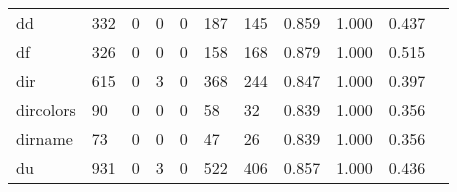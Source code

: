 \begin{longtable}{lp{1.2cm}p{1.2cm}p{1.2cm}p{1.2cm}p{1.2cm}p{1.2cm}p{1.2cm}p{1.2cm}p{1.2cm}p{1.2cm}}
dd        &                                   332 &                                                  0 &                                                  0 &                                                  0 &                                                187 &                                                145 &                                         0.859 &                                              1.000 &                                              0.437 \\
df        &                                   326 &                                                  0 &                                                  0 &                                                  0 &                                                158 &                                                168 &                                         0.879 &                                              1.000 &                                              0.515 \\
dir       &                                   615 &                                                  0 &                                                  3 &                                                  0 &                                                368 &                                                244 &                                         0.847 &                                              1.000 &                                              0.397 \\
dircolors &                                    90 &                                                  0 &                                                  0 &                                                  0 &                                                 58 &                                                 32 &                                         0.839 &                                              1.000 &                                              0.356 \\
dirname   &                                    73 &                                                  0 &                                                  0 &                                                  0 &                                                 47 &                                                 26 &                                         0.839 &                                              1.000 &                                              0.356 \\
du        &                                   931 &                                                  0 &                                                  3 &                                                  0 &                                                522 &                                                406 &                                         0.857 &                                              1.000 &                                              0.436 \\

\end{longtable}
